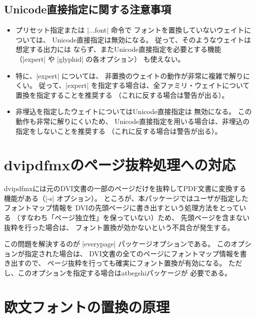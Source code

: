 \documentclass[uplatex,dvipdfmx,a4paper]{jsarticle}
\newcommand{\Pkg}[1]{\textsf{#1}}
\begin{document}
\subsection{Unicode直接指定に関する注意事項}
\label{ssec:DirectUnicodeNotice}

\begin{itemize}
\item プリセット指定または |\set...font| 命令で
  フォントを置換していないウェイトについては、
  Unicode直接指定は無効になる。
  従って、そのようなウェイトは想定する出力には
  ならず、またUnicode直接指定を必要とする機能
  （|expert| や |glyphid| の各オプション）
  も使えない。
\item 特に、|expert| については、
  非置換のウェイトの動作が非常に複雑で解りにくい。
  従って、|expert| を指定する場合は、全ファミリ・ウェイトについて
  置換を指定することを推奨する
  （これに反する場合は警告が出る）。
\item 非埋込を指定したウェイトについてはUnicode直接指定は
  無効になる。
  この動作も非常に解りにくいため、
  Unicode直接指定を用いる場合は、非埋込の指定をしないことを推奨する
  （これに反する場合は警告が出る）。
\end{itemize}


\section{dvipdfmxのページ抜粋処理への対応}
\label{sec:PageSelection}

dvipdfmxには元のDVI文書の一部のページだけを抜粋してPDF文書に変換する
機能がある（|-s| オプション）。
ところが、本パッケージではユーザが指定したフォントマップ情報を
DVIの先頭ページに書き出すという処理方法をとっている
（すなわち「ページ独立性」を保っていない）ため、
先頭ページを含まない抜粋を行った場合は、
フォント置換が効かないという不具合が発生する。

この問題を解決するのが |everypage| パッケージオプションである。
このオプションが指定された場合は、
DVI文書の全てのページにフォントマップ情報を書き出すので、
ページ抜粋を行っても確実にフォント置換が有効になる。
ただし、このオプションを指定する場合は\Pkg{atbegshi}パッケージが
必要である。

\section{欧文フォントの置換の原理}
\label{sec:Mechanism-Alph}
\end{document}
